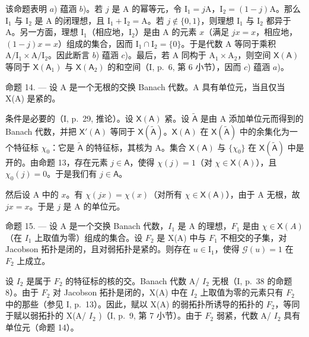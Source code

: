 该命题表明 \(a\)) 蕴涵 \(b\))。若 \(j\) 是 A 的幂等元，令 \(\mathrm{I}_1 = j\mathrm{A}\)，\(\mathrm{I}_2 = (1 - j)\mathrm{A}\)。那么 \(\mathrm{I}_1\) 与 \(\mathrm{I}_2\) 是 A 的闭理想，且 \(\mathrm{I}_1 + \mathrm{I}_2 = \mathrm{A}\)。若 \(j \notin \{0,1\}\)，则理想 \(\mathrm{I}_1\) 与 \(\mathrm{I}_2\) 都异于 A。另一方面，理想 \(\mathrm{I}_1\)（相应地，\(\mathrm{I}_2\)）是由 A 的元素 \(x\)（满足 \(jx = x\)，相应地，\((1 - j)x = x\)）组成的集合，因而 \(\mathrm{I}_1 \cap \mathrm{I}_2 = \{0\}\)。于是代数 A 等同于乘积 \(\mathrm{A} / \mathrm{I}_1 \times \mathrm{A} / \mathrm{I}_2\)。因此断言 \(b\)) 蕴涵 \(c\))。最后，若 A 同构于 \(\mathrm{A}_1 \times \mathrm{A}_2\)，则空间 \(\mathsf{X}(\mathsf{A})\) 等同于 \(\mathsf{X}(\mathsf{A}_1)\) 与 \(\mathsf{X}(\mathsf{A}_2)\) 的和空间（I, p.~6, 第 6 小节），因而 \(c\)) 蕴涵 \(a\))。

命题 14. --- 设 A 是一个无根的交换 Banach 代数。A 具有单位元，当且仅当 X(A) 是紧的。

条件是必要的（I, p.~29, 推论）。设 \(\mathsf{X}(\mathsf{A})\) 紧。设 \(\widetilde{\mathsf{A}}\) 是由 A 添加单位元而得到的 Banach 代数，并把 \(\mathsf{X}'(\mathsf{A})\) 等同于 \(\mathsf{X}(\widetilde{\mathsf{A}})\)。\(\mathsf{X}(\mathsf{A})\) 在 \(\mathsf{X}(\widetilde{\mathsf{A}})\) 中的余集化为一个特征标 \(\chi_0\)：它是 \(\widetilde{\mathsf{A}}\) 的特征标，其核为 A。集合 \(\mathsf{X}(\mathsf{A})\) 与 \(\{\chi_0\}\) 在 \(\mathsf{X}(\widetilde{\mathsf{A}})\) 中是开的。由命题 13，存在元素 \(j \in \mathsf{A}\)，使得 \(\chi(j) = 1\)（对 \(\chi \in \mathsf{X}(\mathsf{A})\)），且 \(\chi_0(j) = 0\)。于是我们有 \(j \in \mathsf{A}\)。

然后设 A 中的 \(x\)。有 \(\chi(jx) = \chi(x)\)（对所有 \(\chi \in \mathsf{X}(\mathsf{A})\)），由于 A 无根，故 \(jx = x\)。于是 \(j\) 是 A 的单位元。

命题 15. --- 设 A 是一个交换 Banach 代数，\(I_{1}\) 是 A 的理想，\(F_{1}\) 是由 \(\chi \in \mathsf{X}(A)\)（在 \(I_{1}\) 上取值为零）组成的集合。设 \(F_{2}\) 是 X(A) 中与 \(F_{1}\) 不相交的子集，对 Jacobson 拓扑是闭的，且对弱拓扑是紧的。则存在 \(u \in \text{I}_{1}\)，使得 \(\mathcal{G}(u) = 1\) 在 \(F_{2}\) 上成立。

设 \(I_{2}\) 是属于 \(F_{2}\) 的特征标的核的交。Banach 代数 A/ \(I_{2}\) 无根（I, p.~38 的命题 8）。由于 \(F_{2}\) 对 Jacobson 拓扑是闭的，X(A) 中在 \(I_{2}\) 上取值为零的元素只有 \(F_{2}\) 中的那些（参见 I, p.~13）。因此，赋以 X(A) 的弱拓扑所诱导的拓扑的 \(F_{2}\)，等同于赋以弱拓扑的 X(A/ \(I_{2}\) )（I, p.~9, 第 7 小节）。由于 \(F_{2}\) 弱紧，代数 A/ \(I_{2}\) 具有单位元（命题 14）。

